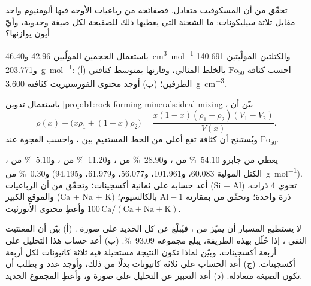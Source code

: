 \begin{exercise}[$\star\star$]\label{exo:b1:rock-forming-minerals:8}
تحقّق من أن المسكوفيت  متعادل. فصفائحه من رباعيات الأوجه فيها ألومنيوم واحد مقابل ثلاثة سيليكونات: ما الشحنة التي يعطيها ذلك للصفيحة لكل صيغة وحدوية، وأيّ أيون يوازنها؟
\end{exercise}

\begin{exercise}[$\star\star$]\label{exo:b1:rock-forming-minerals:9}
باستعمال الحجمين المولّيين \num{42.96} و\qty{46.40}{cm^3.mol^{-1}} والكتلتين المولّيتين \num{140.691} و\qty{203.771}{g.mol^{-1}}: (أ) احسب كثافة $\text{Fo}_{50}$ بالخلط المثالي، وقارنها بمتوسط كثافتي الطرفين؛ (ب) أوجد محتوى الفورستيريت  كثافته \qty{3.600}{g.cm^{-3}}.
\end{exercise}

\begin{exercise}[$\star\star\star$]\label{exo:b1:rock-forming-minerals:10}
باستعمال تدوين \cref{prop:b1:rock-forming-minerals:ideal-mixing}، بيّن أن
\[
  \rho(x) - \bigl(x\rho_1 + (1 - x)\rho_2\bigr) =
  \frac{x(1 - x)(\rho_1 - \rho_2)(V_1 - V_2)}{V(x)} .
\]
ويُستنتج أن كثافة  تقع أعلى من الخط المستقيم بين ، واحسب الفجوة عند $\text{Fo}_{50}$.
\end{exercise}

\begin{exercise}[$\star\star\star$]\label{exo:b1:rock-forming-minerals:11}
يعطي  من جابرو \qty{54.10}{\percent} من ، و\qty{28.90}{\percent} من ، و\qty{11.20}{\percent} من ، و\qty{5.10}{\percent} من ، و\qty{0.30}{\percent} من  (الكتل المولية \num{60.083}، و\num{101.961}، و\num{56.077}، و\num{61.979}، و\qty{94.195}{g.mol^{-1}}). أعد حسابه على ثمانية أكسجينات؛ وتحقّق من أن الرباعيات (Si + Al) تحوي 4 ذرات، والموقع الكبير (Ca + Na + K) ذرة واحدة؛ وتحقّق من  بمقارنة $\mathrm{Al} - 1$ بالكالسيوم؛ وأعطِ محتوى الأنورثيت $100\,\mathrm{Ca}/(\mathrm{Ca} +
\mathrm{Na} + \mathrm{K})$.
\end{exercise}

\begin{exercise}[$\star\star\star$]\label{exo:b1:rock-forming-minerals:12}
لا يستطيع المسبار أن يميّز  من ، فيُبلّغ عن كل الحديد على صورة . (أ) بيّن أن المغنتيت النقي ، إذا حُلّل بهذه الطريقة، يبلغ مجموعه \qty{93.09}{\percent}. (ب) أعد حساب هذا التحليل على أربعة أكسجينات، وبيّن لماذا تكون النتيجة مستحيلة  فيه ثلاثة كاتيونات لكل أربعة أكسجينات. (ج) أعد الحساب على ثلاثة كاتيونات بدلًا من ذلك، وأوجد عدد  و بطلب أن تكون الصيغة متعادلة. (د) أعد التعبير عن التحليل على صورة  و، وأعطِ المجموع الجديد.
\end{exercise}

